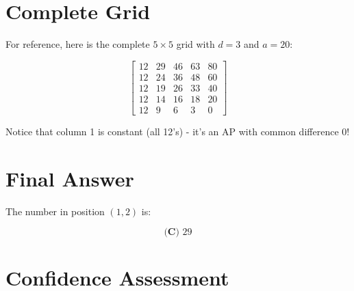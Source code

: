 \documentclass[12pt]{article}
\begin{document}
\section*{Complete Grid}

For reference, here is the complete $5 \times 5$ grid with $d = 3$ and $a = 20$:

\[\begin{bmatrix} 
12 & 29 & 46 & 63 & 80 \\
12 & 24 & 36 & 48 & 60 \\
12 & 19 & 26 & 33 & 40 \\
12 & 14 & 16 & 18 & 20 \\
12 & 9 & 6 & 3 & 0
\end{bmatrix}\]

Notice that column 1 is constant (all 12's) - it's an AP with common difference 0!

\section*{Final Answer}

The number in position $(1,2)$ is:

$$\boxed{\textbf{(C) } 29}$$

\section*{Confidence Assessment}
\end{document}
